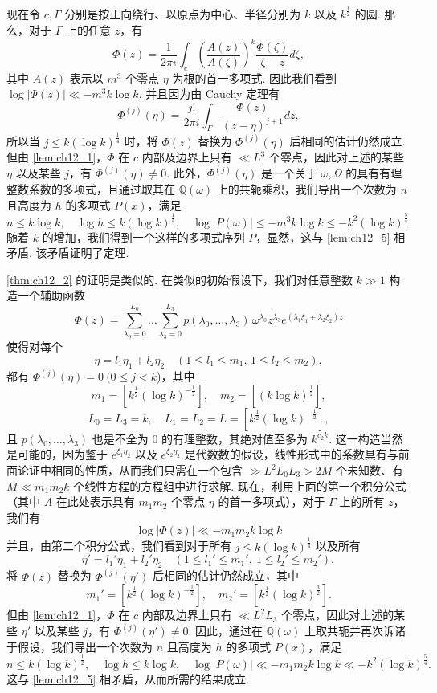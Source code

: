 现在令 $c, \Gamma$ 分别是按正向绕行、以原点为中心、半径分别为 $k$ 以及 $k^{\frac{1}{2}}$ 的圆. 那么，对于 $\Gamma$ 上的任意 $z$，有
\[\Phi(z) = \frac{1}{2\pi i} \int_{c} \left(\frac{A(z)}{A(\zeta)}\right)^k \frac{\Phi(\zeta)}{\zeta - z} d\zeta,\]
其中 $A(z)$ 表示以 $m^3$ 个零点 $\eta$ 为根的首一多项式. 因此我们看到 $\log |\Phi(z)| \ll -m^3 k \log k$. 并且因为由 Cauchy 定理有
\[\Phi^{(j)}(\eta) = \frac{j!}{2\pi i} \int_{\Gamma} \frac{\Phi(z)}{(z-\eta)^{j+1}} dz,\]
所以当 $j \leq k(\log k)^{\frac{1}{4}}$ 时，将 $\Phi(z)$ 替换为 $\Phi^{(j)}(\eta)$ 后相同的估计仍然成立. 但由 \autoref{lem:ch12_1}，$\Phi$ 在 $c$ 内部及边界上只有 $\ll L^3$ 个零点，因此对上述的某些 $\eta$ 以及某些 $j$，有 $\Phi^{(j)}(\eta) \neq 0$. 此外，$\Phi^{(j)}(\eta)$ 是一个关于 $\omega, \Omega$ 的具有有理整数系数的多项式，且通过取其在 $\mathbb{Q}(\omega)$ 上的共轭乘积，我们导出一个次数为 $n$ 且高度为 $h$ 的多项式 $P(x)$，满足
\[n \leqslant k \log k, \quad \log h \leqslant k(\log k)^{\frac{1}{4}}, \quad \log |P(\omega)| \leqslant -m^3 k \log k \leqslant -k^2 (\log k)^{\frac{5}{4}}.\]
随着 $k$ 的增加，我们得到一个这样的多项式序列 $P$，显然，这与 \autoref{lem:ch12_5} 相矛盾. 该矛盾证明了定理.

\autoref{thm:ch12_2} 的证明是类似的. 在类似的初始假设下，我们对任意整数 $k \gg 1$ 构造一个辅助函数
\[\Phi(z) = \sum_{\lambda_0=0}^{L_0} \dots \sum_{\lambda_3=0}^{L_3} p(\lambda_0, \dots, \lambda_3) \, \omega^{\lambda_0} z^{\lambda_3} e^{(\lambda_1 \xi_1 + \lambda_2 \xi_2) z}\]
使得对每个
\[\eta = l_1 \eta_1 + l_2 \eta_2 \quad (1 \leqslant l_1 \leqslant m_1, \, 1 \leqslant l_2 \leqslant m_2),\]
都有 $\Phi^{(j)}(\eta) = 0 \ (0 \le j < k$)，其中
\[m_1 = [k^{\frac{1}{2}}(\log k)^{-\frac{1}{2}}], \quad m_2 = [(k \log k)^{\frac{1}{2}}],\]
\[L_0 = L_3 = k, \quad L_1 = L_2 = L = [k^{\frac{1}{2}}(\log k)^{-\frac{1}{2}}],\]
且 $p(\lambda_0, \dots, \lambda_3)$ 也是不全为 0 的有理整数，其绝对值至多为 $k^{c_2 k}$. 这一构造当然是可能的，因为鉴于 $e^{\xi_1\eta_2}$ 以及 $e^{\xi_2\eta_2}$ 是代数数的假设，线性形式中的系数具有与前面论证中相同的性质，从而我们只需在一个包含 $\gg L^2 L_0 L_3 > 2M$ 个未知数、有 $M \ll m_1 m_2 k$ 个线性方程的方程组中进行求解. 现在，利用上面的第一个积分公式（其中 $A$ 在此处表示具有 $m_1 m_2$ 个零点 $\eta$ 的首一多项式），对于 $\Gamma$ 上的所有 $z$，我们有
\[\log |\Phi(z)| \ll -m_1 m_2 k \log k\]
并且，由第二个积分公式，我们看到对于所有 $j \le k(\log k)^{\frac{1}{4}}$ 以及所有
\[\eta' = l_1' \eta_1 + l_2' \eta_2 \quad (1 \leqslant l_1' \leqslant m_1', \ 1 \leqslant l_2' \leqslant m_2'),\]
将 $\Phi(z)$ 替换为 $\Phi^{(j)}(\eta')$ 后相同的估计仍然成立，其中
\[m_1' = [k^{\frac{1}{2}}(\log k)^{-\frac{1}{2}}], \quad m_2' = [k^{\frac{1}{2}}(\log k)^{\frac{3}{2}}].\]
但由 \autoref{lem:ch12_1}，$\Phi$ 在 $c$ 内部及边界上只有 $\ll L^2 L_3$ 个零点，因此对上述的某些 $\eta'$ 以及某些 $j$，有 $\Phi^{(j)}(\eta') \neq 0$. 因此，通过在 $\mathbb{Q}(\omega)$ 上取共轭并再次诉诸于假设，我们导出一个次数为 $n$ 且高度为 $h$ 的多项式 $P(x)$，满足
\[n \leqslant k(\log k)^{\frac{1}{2}}, \quad \log h \leqslant k \log k, \quad \log |P(\omega)| \ll -m_1 m_2 k \log k \ll -k^2 (\log k)^{\frac{5}{4}}.\]
这与 \autoref{lem:ch12_5} 相矛盾，从而所需的结果成立.

